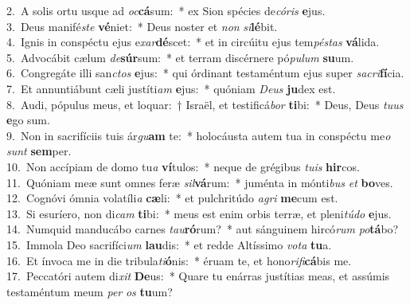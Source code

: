 {2.~}A solis ortu usque ad \textit{oc}\textbf{cá}sum:~* ex Sion spécies de\textit{có}\textit{ris} \textbf{e}jus.\\
{3.~}Deus manifé\textit{ste} \textbf{vé}niet:~* Deus noster et \textit{non} \textit{si}\textbf{lé}bit.\\
{4.~}Ignis in conspéctu ejus e\textit{xar}\textbf{dé}scet:~* et in circúitu ejus tem\textit{pé}\textit{stas} \textbf{vá}lida.\\
{5.~}Advocábit cælum \textit{de}\textbf{súr}sum:~* et terram discérnere pó\textit{pu}\textit{lum} \textbf{su}um.\\
{6.~}Congregáte illi san\textit{ctos} \textbf{e}jus:~* qui órdinant testaméntum ejus super \textit{sa}\textit{cri}\textbf{fí}cia.\\
{7.~}Et annuntiábunt cæli justíti\textit{am} \textbf{e}jus:~* quóniam \textit{De}\textit{us} \textbf{ju}dex est.\\
{8.~}Audi, pópulus meus, et loquar:~† Israël, et testificá\textit{bor} \textbf{ti}bi:~* Deus, Deus \textit{tu}\textit{us} \textbf{e}go sum.\\
{9.~}Non in sacrifíciis tuis ár\textit{gu}\textbf{am} te:~* holocáusta autem tua in conspéctu me\textit{o} \textit{sunt} \textbf{sem}per.\\
{10.~}Non accípiam de domo tu\textit{a} \textbf{ví}tulos:~* neque de grégibus \textit{tu}\textit{is} \textbf{hir}cos.\\
{11.~}Quóniam meæ sunt omnes feræ \textit{sil}\textbf{vá}rum:~* juménta in mónti\textit{bus} \textit{et} \textbf{bo}ves.\\
{12.~}Cognóvi ómnia volatíli\textit{a} \textbf{cæ}li:~* et pulchritúdo \textit{a}\textit{gri} \textbf{me}cum est.\\
{13.~}Si esuríero, non di\textit{cam} \textbf{ti}bi:~* meus est enim orbis terræ, et pleni\textit{tú}\textit{do} \textbf{e}jus.\\
{14.~}Numquid manducábo carnes \textit{tau}\textbf{ró}rum?~* aut sánguinem hircó\textit{rum} \textit{po}\textbf{tá}bo?\\
{15.~}Immola Deo sacrifíci\textit{um} \textbf{lau}dis:~* et redde Altíssimo \textit{vo}\textit{ta} \textbf{tu}a.\\
{16.~}Et ínvoca me in die tribula\textit{ti}\textbf{ó}nis:~* éruam te, et hono\textit{ri}\textit{fi}\textbf{cá}bis me.\\
{17.~}Peccatóri autem di\textit{xit} \textbf{De}us:~* Quare tu enárras justítias meas, et assúmis testaméntum meum \textit{per} \textit{os} \textbf{tu}um?\\
